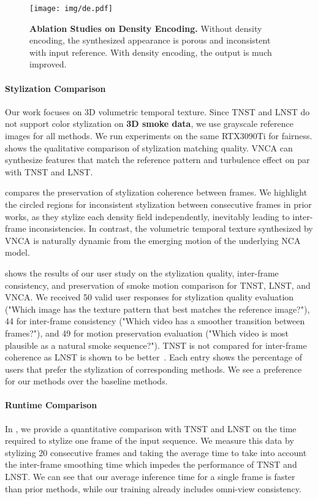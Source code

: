 \begin{figure}
  \centering
  \texttt{[image: img/de.pdf]}
  \caption{\textbf{Ablation Studies on Density Encoding. } Without density encoding, the synthesized appearance is porous and inconsistent with input reference. With density encoding, the output is much improved. }
  \label{fig:de}
\end{figure}



\paragraph{Stylization Comparison}
Our work focuses on 3D volumetric temporal texture. 
Since TNST and LNST do not support color stylization on \textbf{3D smoke data}, we use grayscale reference images for all methods. 
We run experiments on the same RTX3090Ti for fairness. 
 shows the qualitative comparison of stylization matching quality. VNCA can synthesize features that match the reference pattern and turbulence effect on par with TNST and LNST. 



 compares the preservation of stylization coherence between frames. 
We highlight the circled regions for inconsistent stylization between consecutive frames in prior works,
as they stylize each density field independently, inevitably leading to inter-frame inconsistencies. 
In contrast, the volumetric temporal texture synthesized by VNCA is naturally dynamic from the emerging motion of the underlying NCA model. 


 shows the results of our user study on the stylization quality, inter-frame consistency, and preservation of smoke motion comparison for TNST, LNST, and VNCA. 
We received 50 valid user responses for stylization quality evaluation ("Which image has the texture pattern that best matches the reference image?"), 44 for inter-frame consistency ("Which video has a smoother transition between frames?"),
and 49 for motion preservation evaluation ("Which video is most plausible as a natural smoke sequence?"). 
TNST is not compared for inter-frame coherence as LNST is shown to be better~\cite{kimlnst}. 
Each entry shows the percentage of users that prefer the stylization of corresponding methods. 
We see a preference for our methods over the baseline methods. 




\paragraph{Runtime Comparison}
In , we provide a quantitative comparison with TNST and LNST on the time required to stylize one frame of the input sequence. 
We measure this data by stylizing 20 consecutive frames and taking the average time to take into account the inter-frame smoothing time which impedes the performance of TNST and LNST. 
We can see that our average inference time for a single frame is faster than prior methods, while our training already includes omni-view consistency.





